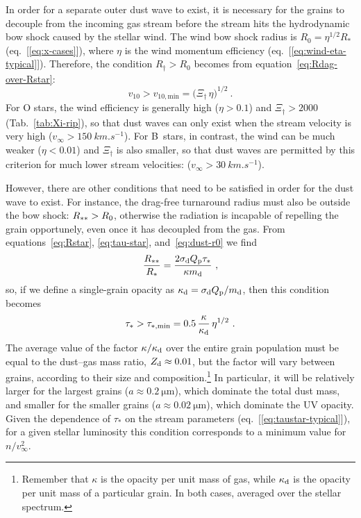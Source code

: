 In order for a separate outer dust wave to exist, it is necessary for
the grains to decouple from the incoming gas stream before the stream
hits the hydrodynamic bow shock caused by the stellar wind.  The wind
bow shock radius is \(R_0 = \eta^{1/2} R_*\) (eq.~[\ref{eq:x-cases}]),
where \(\eta\) is the wind momentum efficiency
(eq.~[\ref{eq:wind-eta-typical}]).  Therefore, the condition
\(R_\dag > R_0\) becomes from equation~\eqref{eq:Rdag-over-Rstar}:
\begin{equation}
  \label{eq:dust-wave-velocity-condition}
  v_{10} > v_{10,\text{min}} = \bigl( \Xi_\dag \, \eta \bigr)^{1/2} \ . 
\end{equation}
For O stars, the wind efficiency is generally high (\(\eta > 0.1\)) and
\(\Xi_\dag > 2000\) (Tab.~\ref{tab:Xi-rip}), so that dust waves can only
exist when the stream velocity is very high
(\(v_\infty > \SI{150}{km.s^{-1}}\)).  For B~stars, in contrast, the wind
can be much weaker (\(\eta < 0.01\)) and \(\Xi_\dag\) is also smaller, so
that dust waves are permitted by this criterion for much lower stream
velocities: (\(v_\infty > \SI{30}{km.s^{-1}}\)).

However, there are other conditions that need to be satisfied in order
for the dust wave to exist.  For instance, the drag-free turnaround
radius must also be outside the bow shock: \(R_{**} > R_0\),
otherwise the radiation is incapable of repelling the grain
opportunely, even once it has decoupled from the gas.  From
equations~\eqref{eq:Rstar}, \eqref{eq:tau-star},
and~\eqref{eq:dust-r0} we find
\begin{equation}
  \label{eq:Rstarstar-over-Rstar}
  \frac{R_{**}}{R_*} = \frac{2 \sigma_{\text{d}} Q_{\text{p}} \tau_*}{\kappa m_{\text{d}}} \ , 
\end{equation}
so, if we define a single-grain opacity as
\(\kappa_{\text{d}} = \sigma_{\text{d}} Q_{\text{p}} / m_{\text{d}}\), then this condition becomes
\begin{equation}
  \label{eq:dust-wave-low-density-condition}
  \tau_* >  \tau_{*,\text{min}} = 0.5\, \frac{\kappa}{\kappa_{\text{d}}}\, \eta^{1/2} 
  \ . 
\end{equation}
The average value of the factor \(\kappa / \kappa_{\text{d}}\) over the entire grain
population must be equal to the dust--gas mass ratio,
\(Z_{\text{d}} \approx 0.01\), but the factor will vary between grains, according
to their size and composition.\footnote{%
  Remember that \(\kappa\) is the opacity per unit mass of gas, while
  \(\kappa_{\text{d}}\) is the opacity per unit mass of a particular grain. In
  both cases, averaged over the stellar spectrum.} %
In particular, it will be relatively larger for the largest grains
(\(a \approx \SI{0.2}{\um}\)), which dominate the total dust mass, and
smaller for the smaller grains (\(a \approx \SI{0.02}{\um}\)), which
dominate the UV opacity.  Given the dependence of \(\tau_*\) on the
stream parameters (eq.~[\ref{eq:taustar-typical}]), for a given
stellar luminosity this condition corresponds to a minimum value for
\(n / v_\infty^2\).


